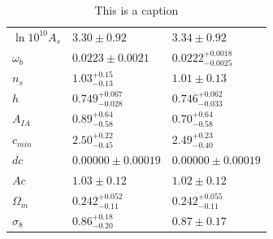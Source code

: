 \documentclass{aa}
\begin{document}
\begin{appendix}
\begin{table}
\begin{tabular}{lll}
$\ln10^{10}A_{s }$ & $3.30\pm 0.92              $& $3.34\pm 0.92              $\\

$\omega_{b }    $ & $0.0223\pm 0.0021          $& $0.0222^{+0.0018}_{-0.0025}$\\

$n_{s }         $ & $1.03^{+0.15}_{-0.13}      $& $1.01\pm 0.13              $\\

$h              $ & $0.749^{+0.067}_{-0.028}   $& $0.746^{+0.062}_{-0.033}   $\\
\hline
$A_{IA }        $ & $0.89^{+0.64}_{-0.58}      $& $0.70^{+0.64}_{-0.58}              $\\

$c_{min }       $ & $2.50^{+0.22}_{-0.45}      $& $2.49^{+0.23}_{-0.40}     $\\

$dc             $ & $0.00000\pm 0.00019        $& $0.00000\pm 0.00019        $\\

$Ac             $ & $1.03\pm 0.12              $& $1.02\pm 0.12              $\\

$\Omega_{m }    $ & $0.242^{+0.052}_{-0.11}    $& $0.242^{+0.055}_{-0.11}    $\\

$\sigma_8        $ & $0.86^{+0.18}_{-0.20}      $& $0.87\pm 0.17      $\\
\hline
\end{tabular}
\caption{{\color{red} This is a caption}}
\label{tab:consistency}
\end{table}

\end{appendix}
\end{document}
